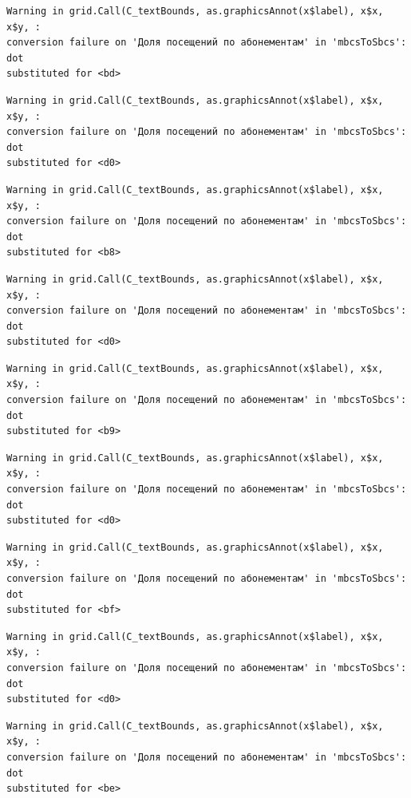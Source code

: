 \documentclass[
  letterpaper,
  DIV=11,
  numbers=noendperiod]{scrartcl}
\begin{document}
\begin{verbatim}
Warning in grid.Call(C_textBounds, as.graphicsAnnot(x$label), x$x, x$y, :
conversion failure on 'Доля посещений по абонементам' in 'mbcsToSbcs': dot
substituted for <bd>
\end{verbatim}

\begin{verbatim}
Warning in grid.Call(C_textBounds, as.graphicsAnnot(x$label), x$x, x$y, :
conversion failure on 'Доля посещений по абонементам' in 'mbcsToSbcs': dot
substituted for <d0>
\end{verbatim}

\begin{verbatim}
Warning in grid.Call(C_textBounds, as.graphicsAnnot(x$label), x$x, x$y, :
conversion failure on 'Доля посещений по абонементам' in 'mbcsToSbcs': dot
substituted for <b8>
\end{verbatim}

\begin{verbatim}
Warning in grid.Call(C_textBounds, as.graphicsAnnot(x$label), x$x, x$y, :
conversion failure on 'Доля посещений по абонементам' in 'mbcsToSbcs': dot
substituted for <d0>
\end{verbatim}

\begin{verbatim}
Warning in grid.Call(C_textBounds, as.graphicsAnnot(x$label), x$x, x$y, :
conversion failure on 'Доля посещений по абонементам' in 'mbcsToSbcs': dot
substituted for <b9>
\end{verbatim}

\begin{verbatim}
Warning in grid.Call(C_textBounds, as.graphicsAnnot(x$label), x$x, x$y, :
conversion failure on 'Доля посещений по абонементам' in 'mbcsToSbcs': dot
substituted for <d0>
\end{verbatim}

\begin{verbatim}
Warning in grid.Call(C_textBounds, as.graphicsAnnot(x$label), x$x, x$y, :
conversion failure on 'Доля посещений по абонементам' in 'mbcsToSbcs': dot
substituted for <bf>
\end{verbatim}

\begin{verbatim}
Warning in grid.Call(C_textBounds, as.graphicsAnnot(x$label), x$x, x$y, :
conversion failure on 'Доля посещений по абонементам' in 'mbcsToSbcs': dot
substituted for <d0>
\end{verbatim}

\begin{verbatim}
Warning in grid.Call(C_textBounds, as.graphicsAnnot(x$label), x$x, x$y, :
conversion failure on 'Доля посещений по абонементам' in 'mbcsToSbcs': dot
substituted for <be>
\end{verbatim}
\end{document}
